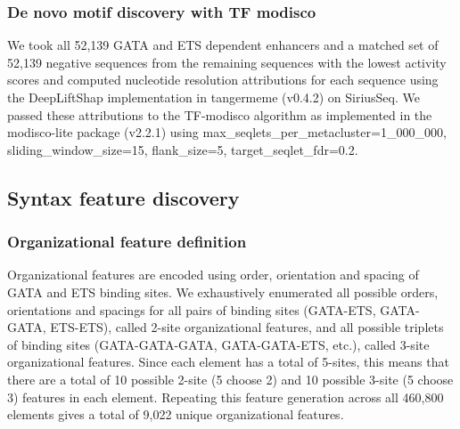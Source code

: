 \subsubsection{De novo motif discovery with TF modisco}
We took all 52,139 GATA and ETS dependent enhancers and a matched set of 52,139 negative sequences from the remaining sequences with the lowest activity scores and computed nucleotide resolution attributions for each sequence using the DeepLiftShap implementation in tangermeme (v0.4.2) on SiriusSeq. We passed these attributions to the TF-modisco algorithm as implemented in the modisco-lite package (v2.2.1) using max\_seqlets\_per\_metacluster=1\_000\_000, sliding\_window\_size=15, flank\_size=5, target\_seqlet\_fdr=0.2.

\subsection{Syntax feature discovery}

\subsubsection{Organizational feature definition}
Organizational features are encoded using order, orientation and spacing of GATA and ETS binding sites. We exhaustively enumerated all possible orders, orientations and spacings for all pairs of binding sites (GATA-ETS, GATA-GATA, ETS-ETS), called 2-site organizational features, and all possible triplets of binding sites (GATA-GATA-GATA, GATA-GATA-ETS, etc.), called 3-site organizational features. Since each element has a total of 5-sites, this means that there are a total of 10 possible 2-site (5 choose 2) and 10 possible 3-site (5 choose 3) features in each element. Repeating this feature generation across all 460,800 elements gives a total of 9,022 unique organizational features.

